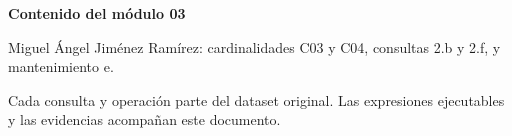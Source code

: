 \documentclass[11pt,letterpaper]{article}
\begin{document}

\tableofcontents
\vspace{1cm}
\textbf{Contenido del módulo 03}\par
Miguel Ángel Jiménez Ramírez: cardinalidades C03 y C04, consultas 2.b y 2.f, y mantenimiento e.

Cada consulta y operación parte del dataset original. Las expresiones ejecutables y las evidencias acompañan este documento.
\clearpage

\clearpage

\clearpage

\clearpage

\clearpage

\end{document}

